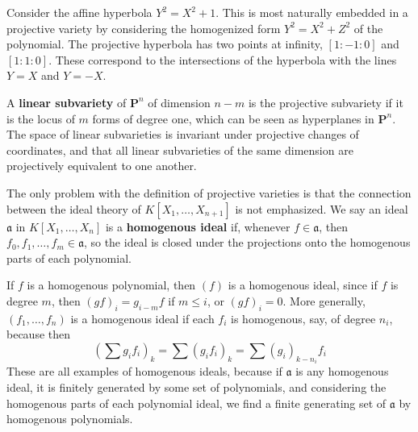 \begin{example}
    Consider the affine hyperbola $Y^2 = X^2 + 1$. This is most naturally embedded in a projective variety by considering the homogenized form $Y^2 = X^2 + Z^2$ of the polynomial. The projective hyperbola has two points at infinity, $[1:-1:0]$ and $[1:1:0]$. These correspond to the intersections of the hyperbola with the lines $Y = X$ and $Y = -X$.
\end{example}

\begin{example}
    A {\bf linear subvariety} of $\mathbf{P}^n$ of dimension $n-m$ is the projective subvariety if it is the locus of $m$ forms of degree one, which can be seen as hyperplanes in $\mathbf{P}^n$. The space of linear subvarieties is invariant under projective changes of coordinates, and that all linear subvarieties of the same dimension are projectively equivalent to one another.
\end{example}

The only problem with the definition of projective varieties is that the connection between the ideal theory of $K[X_1, \dots, X_{n+1}]$ is not emphasized. We say an ideal $\mathfrak{a}$ in $K[X_1, \dots, X_n]$ is a {\bf homogenous ideal} if, whenever $f \in \mathfrak{a}$, then $f_0,f_1, \dots, f_m \in \mathfrak{a}$, so the ideal is closed under the projections onto the homogenous parts of each polynomial.

\begin{example}
    If $f$ is a homogenous polynomial, then $(f)$ is a homogenous ideal, since if $f$ is degree $m$, then $(gf)_i = g_{i-m}f$ if $m \leq i$, or $(gf)_i = 0$. More generally, $(f_1, \dots, f_n)$ is a homogenous ideal if each $f_i$ is homogenous, say, of degree $n_i$, because then
    \[ \left(\sum g_if_i \right)_k = \sum (g_if_i)_k = \sum (g_i)_{k - n_i} f_i \]
    These are all examples of homogenous ideals, because if $\mathfrak{a}$ is any homogenous ideal, it is finitely generated by some set of polynomials, and considering the homogenous parts of each polynomial ideal, we find a finite generating set of $\mathfrak{a}$ by homogenous polynomials.
\end{example}

